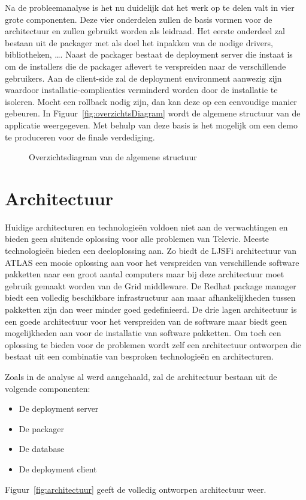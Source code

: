 
Na de probleemanalyse is het nu duidelijk dat het werk op te delen valt in vier grote componenten.
Deze vier onderdelen zullen de basis vormen voor de architectuur en zullen gebruikt worden als leidraad.
Het eerste onderdeel zal bestaan uit de packager met als doel het inpakken van de nodige drivers, bibliotheken, \ldots .
Naast de packager bestaat de deployment server die instaat is om de installers die de packager aflevert te verspreiden naar de verschillende gebruikers.
Aan de client-side zal de deployment environment aanwezig zijn waardoor installatie-complicaties verminderd worden door de installatie te isoleren.
Mocht een rollback nodig zijn, dan kan deze op een eenvoudige manier gebeuren.
In Figuur~\vref{fig:overzichtsDiagram} wordt de algemene structuur van de applicatie weergegeven.
Met behulp van deze basis is het mogelijk om een demo te produceren voor de finale verdediging.

\begin{figure}[!hbt]
\centering
  
  \caption{Overzichtsdiagram van de algemene structuur}
  \label{fig:overzichtsDiagram}
\end{figure}

\section{Architectuur}
Huidige architecturen en technologieën voldoen niet aan de verwachtingen en bieden geen sluitende oplossing voor alle problemen van Televic.
Meeste technologieën bieden een deeloplossing aan.
Zo biedt de LJSFi architectuur van ATLAS een mooie oplossing aan voor het verspreiden van verschillende software pakketten naar een groot aantal computers maar bij deze architectuur moet gebruik gemaakt worden van de Grid middleware.
De Redhat package manager biedt een volledig beschikbare infrastructuur aan maar afhankelijkheden tussen pakketten zijn dan weer minder goed gedefinieerd.
De drie lagen architectuur is een goede architectuur voor het verspreiden van de software maar biedt geen mogelijkheden aan voor de installatie van software pakketten.
Om toch een oplossing te bieden voor de problemen wordt zelf een architectuur ontworpen die bestaat uit een combinatie van besproken technologieën en architecturen.

Zoals in de analyse al werd aangehaald, zal de architectuur bestaan uit de volgende componenten: 
\begin{itemize}
\item De deployment server
\item De packager
\item De database
\item De deployment client
\end{itemize}
Figuur~\vref{fig:architectuur} geeft de volledig ontworpen architectuur weer.

